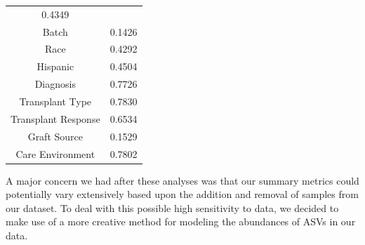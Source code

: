 \documentclass[12pt,twoside]{dukestatscithesis}
\begin{document}
\begin{longtable}[]{@{}cc@{}}
\begin{minipage}[t]{0.30\columnwidth}
0.4349\strut
\end{minipage}\tabularnewline
\begin{minipage}[t]{0.51\columnwidth}\centering\strut
Batch\strut
\end{minipage} & \begin{minipage}[t]{0.30\columnwidth}\centering\strut
0.1426\strut
\end{minipage}\tabularnewline
\begin{minipage}[t]{0.51\columnwidth}\centering\strut
Race\strut
\end{minipage} & \begin{minipage}[t]{0.30\columnwidth}\centering\strut
0.4292\strut
\end{minipage}\tabularnewline
\begin{minipage}[t]{0.51\columnwidth}\centering\strut
Hispanic\strut
\end{minipage} & \begin{minipage}[t]{0.30\columnwidth}\centering\strut
0.4504\strut
\end{minipage}\tabularnewline
\begin{minipage}[t]{0.51\columnwidth}\centering\strut
Diagnosis\strut
\end{minipage} & \begin{minipage}[t]{0.30\columnwidth}\centering\strut
0.7726\strut
\end{minipage}\tabularnewline
\begin{minipage}[t]{0.51\columnwidth}\centering\strut
Transplant Type\strut
\end{minipage} & \begin{minipage}[t]{0.30\columnwidth}\centering\strut
0.7830\strut
\end{minipage}\tabularnewline
\begin{minipage}[t]{0.51\columnwidth}\centering\strut
Transplant Response\strut
\end{minipage} & \begin{minipage}[t]{0.30\columnwidth}\centering\strut
0.6534\strut
\end{minipage}\tabularnewline
\begin{minipage}[t]{0.51\columnwidth}\centering\strut
Graft Source\strut
\end{minipage} & \begin{minipage}[t]{0.30\columnwidth}\centering\strut
0.1529\strut
\end{minipage}\tabularnewline
\begin{minipage}[t]{0.51\columnwidth}\centering\strut
Care Environment\strut
\end{minipage} & \begin{minipage}[t]{0.30\columnwidth}\centering\strut
0.7802\strut
\end{minipage}\tabularnewline
\bottomrule
\end{longtable}
A major concern we had after these analyses was that our summary metrics
could potentially vary extensively based upon the addition and removal
of samples from our dataset. To deal with this possible high sensitivity
to data, we decided to make use of a more creative method for modeling
the abundances of ASVs in our data.
\end{document}
